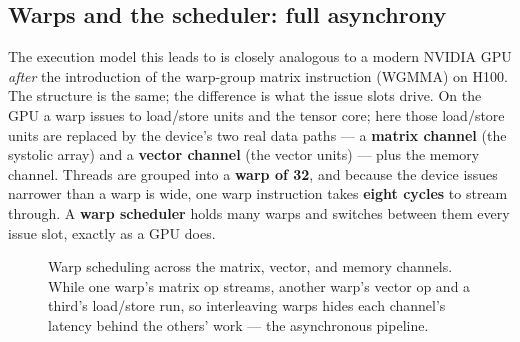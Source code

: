 \documentclass[11pt]{report}
\begin{document}
\subsection{Warps and the scheduler: full asynchrony}

The execution model this leads to is closely analogous to a modern NVIDIA
GPU \emph{after} the introduction of the warp-group matrix instruction
(WGMMA) on H100. The structure is the same; the difference is what the
issue slots drive. On the GPU a warp issues to load/store units and the
tensor core; here those load/store units are replaced by the device's two
real data paths --- a \textbf{matrix channel} (the systolic array) and a
\textbf{vector channel} (the vector units) --- plus the memory channel.
Threads are grouped into a \textbf{warp of 32}, and because the device issues
narrower than a warp is wide, one warp instruction takes \textbf{eight
cycles} to stream through. A \textbf{warp scheduler} holds many warps and
switches between them every issue slot, exactly as a GPU does.

\begin{figure}[t]
\centering
{}
\caption{Warp scheduling across the matrix, vector, and memory channels.
While one warp's matrix op streams, another warp's vector op and a third's
load/store run, so interleaving warps hides each channel's latency behind the
others' work --- the asynchronous pipeline.}
\label{fig:simt-warp}
\end{figure}
\end{document}
